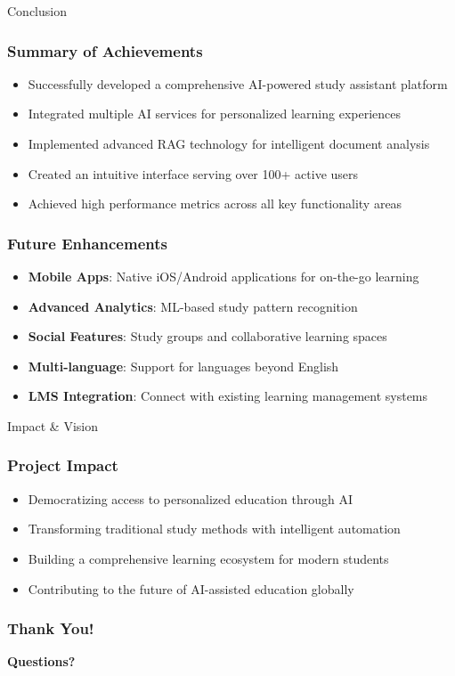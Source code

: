 \documentclass{beamer}
\begin{document}
\begin{frame}{Conclusion}
\frametitle{Summary of Achievements}
\begin{itemize}
\item Successfully developed a comprehensive AI-powered study assistant platform
\item Integrated multiple AI services for personalized learning experiences
\item Implemented advanced RAG technology for intelligent document analysis
\item Created an intuitive interface serving over 100+ active users
\item Achieved high performance metrics across all key functionality areas
\end{itemize}

\vspace{0.5cm}
\frametitle{Future Enhancements}
\begin{itemize}
\item \textbf{Mobile Apps}: Native iOS/Android applications for on-the-go learning
\item \textbf{Advanced Analytics}: ML-based study pattern recognition
\item \textbf{Social Features}: Study groups and collaborative learning spaces
\item \textbf{Multi-language}: Support for languages beyond English
\item \textbf{LMS Integration}: Connect with existing learning management systems
\end{itemize}
\end{frame}

\begin{frame}{Impact \& Vision}
\frametitle{Project Impact}
\begin{itemize}
\item Democratizing access to personalized education through AI
\item Transforming traditional study methods with intelligent automation
\item Building a comprehensive learning ecosystem for modern students
\item Contributing to the future of AI-assisted education globally
\end{itemize}

\vspace{0.5cm}
\frametitle{Thank You!}
\begin{center}
\textbf{Questions?}
\end{center}
\end{frame}
\end{document}

